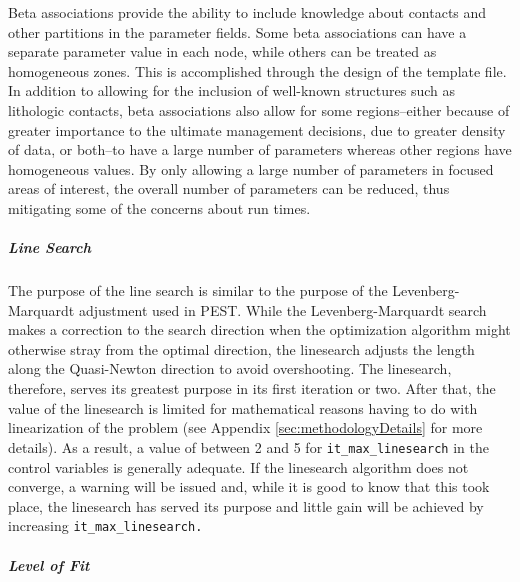\documentclass[11pt,oneside,onecolumn]{usgsreport}
\begin{document}
\begin{multicols}{2}
Beta associations provide the ability to include knowledge about contacts
and other partitions in the parameter fields. Some beta associations
can have a separate parameter value in each node, while others can
be treated as homogeneous zones. This is accomplished through the
design of the template file. In addition to allowing for the inclusion
of well-known structures such as lithologic contacts, beta associations
also allow for some regions--either because of greater importance
to the ultimate management decisions, due to greater density of data,
or both--to have a large number of parameters whereas other regions
have homogeneous values. By only allowing a large number of parameters
in focused areas of interest, the overall number of parameters can
be reduced, thus mitigating some of the concerns about run times.


\subparagraph*{Line Search}

The purpose of the line search is similar to the purpose of the Levenberg-Marquardt
adjustment used in PEST. While the Levenberg-Marquardt search makes
a correction to the search direction when the optimization algorithm
might otherwise stray from the optimal direction, the linesearch adjusts
the length along the Quasi-Newton direction to avoid overshooting.
The linesearch, therefore, serves its greatest purpose in its first
iteration or two. After that, the value of the linesearch is limited
for mathematical reasons having to do with linearization of the problem
(see Appendix \ref{sec:methodologyDetails} for more details). As
a result, a value of between 2 and 5 for \texttt{it\_max\_linesearch}
in the control variables is generally adequate. If the linesearch
algorithm does not converge, a warning will be issued and, while it
is good to know that this took place, the linesearch has served its
purpose and little gain will be achieved by increasing \texttt{it\_max\_linesearch.}


\subparagraph*{Level of Fit}


\end{multicols}
\end{document}
